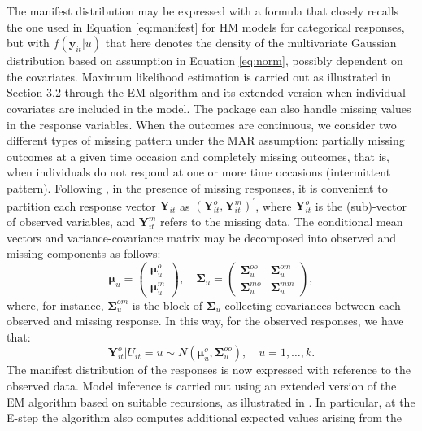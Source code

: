 The manifest distribution may be expressed with a formula that closely
recalls the one used in Equation \eqref{eq:manifest} for HM models for
categorical responses, but with \(f(\boldsymbol{y}_{it}|u)\) that here denotes the
density of the multivariate Gaussian distribution based on assumption in
Equation \eqref{eq:norm}, possibly dependent on the covariates. Maximum
likelihood estimation is carried out as illustrated in Section 3.2
through the EM algorithm and its extended version when individual
covariates are included in the model. The  package can
also handle missing values in the response variables. When the outcomes
are continuous, we consider two different types of missing pattern under
the MAR assumption: partially missing outcomes at a given time occasion
and completely missing outcomes, that is, when individuals do not
respond at one or more time occasions (intermittent pattern). Following
\cite{pand:bart:penn:23}, in the presence of missing responses, it is
convenient to partition each response vector \(\boldsymbol{Y}_{it}\) as
\((\boldsymbol{Y}_{it}^o, \boldsymbol{Y}_{it}^m)^\prime\), where \(\boldsymbol{Y}_{it}^o\) is the
(sub)-vector of observed variables, and \(\boldsymbol{Y}_{it}^m\) refers to the
missing data. The conditional mean vectors and variance-covariance
matrix may be decomposed into observed and missing components as
follows:
\[
\boldsymbol{\mu}_u =  \begin{pmatrix}
\boldsymbol{\mu}_u^{o} \\
\boldsymbol{\mu}_{u}^m
\end{pmatrix}, \quad \boldsymbol{\Sigma}_u =  \begin{pmatrix}
\boldsymbol{\Sigma}_u^{oo} &  \boldsymbol{\Sigma}_u^{om}\\
\boldsymbol{\Sigma}_u^{mo} & \boldsymbol{\Sigma}_u^{mm}
\end{pmatrix},
\]
where, for instance, \(\boldsymbol{\Sigma}_u^{om}\) is the block of
\(\boldsymbol{\Sigma}_u\) collecting covariances between each observed and missing
response. In this way, for the observed responses, we have that:
\[
\boldsymbol{Y}_{it}^o|U_{it}=u\sim N( \boldsymbol{\mu}_u^o, \boldsymbol{\Sigma}_u^{oo}),\quad u=1,\ldots,k.
\label{eq:normMiss}
\]
The manifest distribution of the responses is now expressed with
reference to the observed data. Model inference is carried out using an
extended version of the EM algorithm based on suitable recursions, as
illustrated in \cite{pand:bart:penn:23}. In particular, at the E-step
the algorithm also computes additional expected values arising from the
